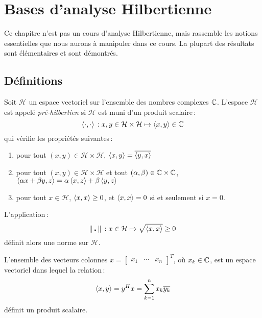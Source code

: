 \chapter{Bases d'analyse Hilbertienne}
Ce chapitre n'est pas un cours d'analyse Hilbertienne, mais
rassemble les notions essentielles que nous aurons \`{a} manipuler dans ce
cours. La plupart des r\'{e}sultats sont \'{e}l\'{e}mentaires et sont d\'{e}montr\'{e}s.
\section{D\'{e}finitions}
\begin{definition}
\label{def:prod_inter} Soit $\mathcal{H}$ un espace vectoriel sur
l'ensemble des nombres complexes $\mathbb{C}$. L'espace $\mathcal{H}$
est appel\'{e} \emph{pr\'{e}-hilbertien} si $\mathcal{H}$ est muni d'un
produit scalaire\,:
$$
 \left\langle \cdot, \cdot \right\rangle\, : x,y\in \mathcal{H} \times \mathcal{H}
 \mapsto \left\langle x, y \right\rangle\in \mathbb{C}
$$
qui v\'{e}rifie les propri\'{e}t\'{e}s suivantes\,:
\begin{enumerate}[label=\emph{\alph*})]
\item pour tout $(x,y) \in \mathcal{H} \times \mathcal{H}$,
  $\left\langle x, y \right\rangle=\overline{\left\langle y, x \right\rangle}$
   \item pour tout $(x,y) \in \mathcal{H} \times \mathcal{H}$ et tout $(\alpha,\beta) \in \mathbb{C} \times \mathbb{C}$,
$\left\langle \alpha x+ \beta y, z \right\rangle= \alpha \left\langle x, z \right\rangle+ \beta \left\langle y, z \right\rangle$
   \item pour tout $x \in \mathcal{H}$, $\left\langle x, x \right\rangle\geq 0$, et $\left\langle x, x \right\rangle=0$ si et seulement si $x=0$.
\end{enumerate}
L'application\,:
\[
\| \centerdot \|\, : x\in\mathcal{H}
  \mapsto \sqrt{\left\langle x, x \right\rangle} \geq 0
\]
d\'{e}finit alors une norme sur $\mathcal{H}$.
\end{definition}
\begin{example}
L'ensemble des vecteurs colonnes
$x=[\begin{matrix}x_1&\cdots&x_n\end{matrix}]^T$, o\`{u} $x_k\in
\mathbb{C}$, est un espace vectoriel dans lequel la relation\,:
$$
\left\langle x, y \right\rangle=y^Hx=\sum_{k=1}^n x_k\overline{y_k}
$$
d\'{e}finit un produit scalaire.
\end{example}
